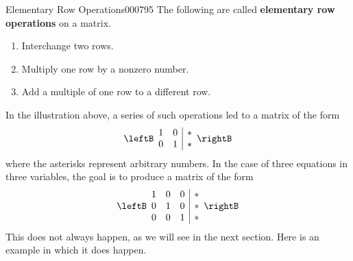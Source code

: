 \begin{definition}{Elementary Row Operations}{000795}
The following are called \textbf{elementary row operations} on a matrix.

\begin{enumerate}[label={\Roman*.}]
\item Interchange two rows.

\item Multiply one row by a {\normalfont nonzero} number.

\item Add a multiple of one row to a {\normalfont different} row.

\end{enumerate}
\end{definition}

In the illustration above, a series of such operations led to a matrix of the form
\begin{equation*}
\leftB \begin{array}{rr|r}
	1 & 0 & * \\
	0 & 1 & * 
\end{array} \rightB
\end{equation*}
where the asterisks represent arbitrary numbers. In the case of three equations in three variables, the goal is to produce a matrix of the form
\begin{equation*}
\leftB \begin{array}{rrr|r}
1 & 0 & 0 & * \\
0 & 1 & 0 & * \\
0 & 0 & 1 & *
\end{array} \rightB
\end{equation*}
This does not always happen, as we will see in the next section. Here is an example in which it does happen.


